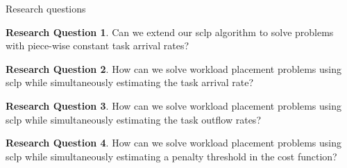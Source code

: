 \documentclass[pdf]{beamer}
\theoremstyle{definition}
\newtheorem{question}{Research Question}
\begin{document}
\begin{frame}{Research questions}

    \begin{question}
        Can we extend our \gls{sclp} algorithm to solve problems with piece-wise constant task arrival rates?
    \end{question}

    \begin{question}
        How can we solve workload placement problems using \gls{sclp} while simultaneously estimating the task arrival rate?
    \end{question}

    \begin{question}
        How can we solve workload placement problems using \gls{sclp} while simultaneously estimating the task outflow rates?
    \end{question}

    \begin{question}
        How can we solve workload placement problems using \gls{sclp} while simultaneously estimating a penalty threshold in the cost function?
    \end{question}

\end{frame}
\end{document}
